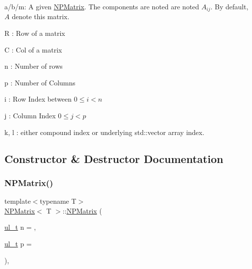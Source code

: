 \begin{DoxyItemize}
\item {\ttfamily a}/{\ttfamily b}/{\ttfamily m}\+: A given {\ttfamily \mbox{\hyperlink{class_n_p_matrix}{N\+P\+Matrix}}}. The components are noted are noted $ A_{ij} $. By default, $ A $ denote {\ttfamily this} matrix.
\item {\ttfamily R} \+: Row of a matrix
\item {\ttfamily C} \+: Col of a matrix
\item {\ttfamily n} \+: Number of rows
\item {\ttfamily p} \+: Number of Columns
\item {\ttfamily i} \+: Row Index between $ 0 \leq i < n $
\item {\ttfamily j} \+: Column Index $ 0 \leq j < p $
\item {\ttfamily k}, {\ttfamily l} \+: either compound index or underlying {\ttfamily std\+::vector} array index. 
\end{DoxyItemize}

\subsection{Constructor \& Destructor Documentation}
\mbox{\label{class_n_p_matrix_a911b2434435553b06276977f3a86bb87}} 
\subsubsection{\texorpdfstring{NPMatrix()}{NPMatrix()}\hspace{0.1cm}{\footnotesize\ttfamily [1/7]}}
{\footnotesize\ttfamily template$<$typename T$>$ \\
\mbox{\hyperlink{class_n_p_matrix}{N\+P\+Matrix}}$<$ T $>$\+::\mbox{\hyperlink{class_n_p_matrix}{N\+P\+Matrix}} (\begin{DoxyParamCaption}\item[{\mbox{\hyperlink{group___n_algebra_ga1b140a2034db3f5dfe18a987745df43a}{ul\+\_\+t}}}]{n = {},  }\item[{\mbox{\hyperlink{group___n_algebra_ga1b140a2034db3f5dfe18a987745df43a}{ul\+\_\+t}}}]{p = {} }\end{DoxyParamCaption})\hspace{0.3cm}{\ttfamily [inline]}, {\ttfamily [explicit]}}



